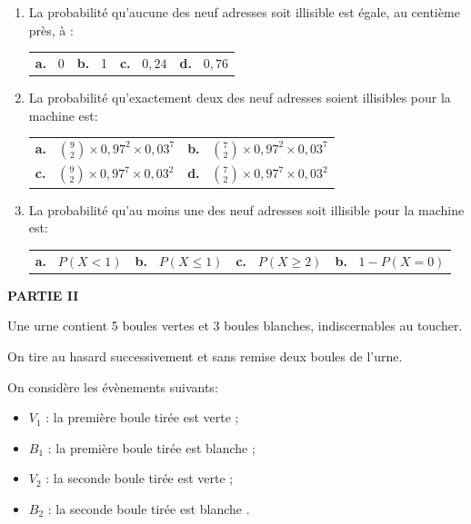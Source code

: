 \documentclass[10pt]{article}
\begin{document}
\begin{enumerate}
\item La probabilité qu'aucune des neuf adresses soit illisible est égale, au centième près, à :
\begin{center}
\begin{tabularx}{\linewidth}{*{4}{X}}
\textbf{a.~} 0 &\textbf{b.~} 1 &\textbf{c.~} $0,24$ &\textbf{d.~} $0,76$
\end{tabularx}
\end{center}
\item  La probabilité qu'exactement deux des neuf adresses soient illisibles pour la machine est:
\begin{center}
\begin{tabularx}{\linewidth}{*{2}{X}}
\textbf{a.~} $\binom{9}{2} \times  0,97^2 \times 0,03^7$ &\textbf{b.~} $\binom{7}{2} \times  0,97^2 \times 0,03^7$\\
\textbf{c.~} $\binom{9}{2} \times 0,97^7 \times  0,03^2$ &\textbf{d.~} $\binom{7}{2} \times 0,97^7 \times 0,03^2$
\end{tabularx}
\end{center}
\item  La probabilité qu'au moins une des neuf adresses soit illisible pour la machine est:
\begin{center}
\begin{tabularx}{\linewidth}{*{4}{X}}
\textbf{a.~} $P(X < 1)$ &\textbf{b.~} $P(X \leqslant 1)$ &\textbf{c.~} $P(X \geqslant 2)$ &\textbf{b.~} $1- P(X = 0)$ 
\end{tabularx}
\end{center}
\end{enumerate}

\medskip

\textbf{PARTIE II}

\medskip

Une urne contient 5 boules vertes et 3 boules blanches, indiscernables au toucher. 

On tire au hasard successivement et sans remise deux boules de l'urne.

On considère les évènements suivants:

\setlength\parindent{1cm}
\begin{itemize}
\item[$\bullet~~$] $V_1$ : \og la première boule tirée est verte \fg{} ;
\item[$\bullet~~$] $B_1$ : \og la première boule tirée est blanche \fg{} ;
\item[$\bullet~~$] $V_2$ : \og la seconde boule tirée est verte \fg{} ;
\item[$\bullet~~$] $B_2$ : \og la seconde boule tirée est blanche \fg.
\end{itemize}
\setlength\parindent{0cm}
\end{document}
